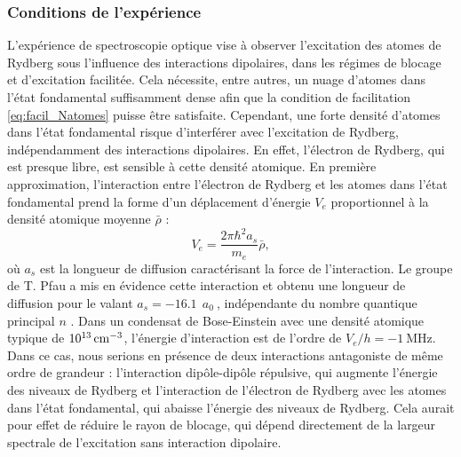 	\subsubsection*{Conditions de l'expérience}
\noindent	L'expérience de spectroscopie optique vise à observer l'excitation des atomes de Rydberg sous l'influence des interactions dipolaires, dans les régimes de blocage et d'excitation facilitée.
Cela nécessite, entre autres, un nuage d'atomes dans l'état fondamental suffisamment dense afin que la condition de facilitation \eqref{eq:facil_Natomes} puisse être satisfaite.
Cependant, une forte densité d'atomes dans l'état fondamental risque d'interférer avec l'excitation de Rydberg, indépendamment des interactions dipolaires.
En effet, l'électron de Rydberg, qui est presque libre, est sensible à cette densité atomique.
En première approximation, l'interaction entre l'électron de Rydberg et les atomes dans l'état fondamental prend la forme d'un déplacement d'énergie $V_e$ proportionnel à la densité atomique moyenne $\bar{\rho}$ \cite{MX_PFAURYDBERGBEC13} :
\begin{equation}
\label{eq:Pfau_shift}
V_e = \frac{2\pi \hbar ^2 a_s}{m_e} \bar{\rho},
\end{equation}
où $a_s$ est la longueur de diffusion caractérisant la force de l'interaction.
Le groupe de T. Pfau a mis en évidence cette interaction et obtenu une longueur de diffusion pour le  valant $a_s = -\SI{16.1}{}~a_0~$, indépendante du nombre quantique principal $n$ \cite{MX_PFAURYDBERGBEC13}.
Dans un condensat de Bose-Einstein avec une densité atomique typique de $\SI{e13}{\per \raiseto{3}\centi\meter}$, l'énergie d'interaction est de l'ordre de $V_e/h = -\SI{1}{\MHz}$.
Dans ce cas, nous serions en présence de deux interactions antagoniste de même ordre de grandeur : l'interaction dipôle-dipôle répulsive, qui augmente l'énergie des niveaux de Rydberg et l'interaction de l'électron de Rydberg avec les atomes dans l'état fondamental, qui abaisse l'énergie des niveaux de Rydberg.
Cela aurait pour effet de réduire le rayon de blocage, qui dépend directement de la largeur spectrale de l'excitation sans interaction dipolaire.

